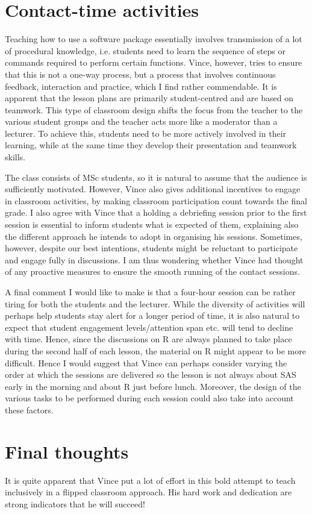 \documentclass[12pt,a4paper]{article}
\begin{document}
\section{Contact-time activities}

Teaching how to use a software package essentially involves transmission of a lot of procedural knowledge, i.e. students need to learn the sequence of steps or commands required to perform certain functions. Vince, however, tries to ensure that this is not a one-way process, but a process that involves continuous feedback, interaction and practice, which I find rather commendable. It is apparent that the lesson plans are primarily student-centred and are based on teamwork. This type of classroom design shifts the focus from the teacher to the various student groups and the teacher acts more like a moderator than a lecturer. To achieve this, students need to be more actively involved in their learning, while at the same time they develop their presentation and teamwork skills.

The class consists of MSc students, so it is natural to assume that the audience is sufficiently motivated. However, Vince also gives additional incentives to engage in classroom activities, by making classroom participation count towards the final grade. I also agree with Vince that a holding a debriefing session prior to the first session is essential to inform students what is expected of them, explaining also the different approach he intends to adopt in organising his sessions. Sometimes, however, despite our best intentions, students might be reluctant to participate and engage fully in discussions. I am thus wondering whether Vince had thought of any proactive measures to ensure the smooth running of the contact sessions.

A final comment I would like to make is that a four-hour session can be rather tiring for both the students and the lecturer. While the diversity of activities will perhaps help students stay alert for a longer period of time, it is also natural to expect that student engagement levels/attention span etc. will tend to decline with time. Hence, since the discussions on R are always planned to take place during the second half of each lesson, the material on R might appear to be more difficult. Hence I would suggest that Vince can perhaps consider varying the order at which the sessions are delivered so the lesson is not always about SAS early in the morning and about R just before lunch. Moreover, the design of the various tasks to be performed during each session could also take into account these factors.

\section{Final thoughts}

It is quite apparent that Vince put a lot of effort in this bold attempt to teach inclusively in a flipped classroom approach. His hard work and dedication are strong indicators that he will succeed!
\end{document}
